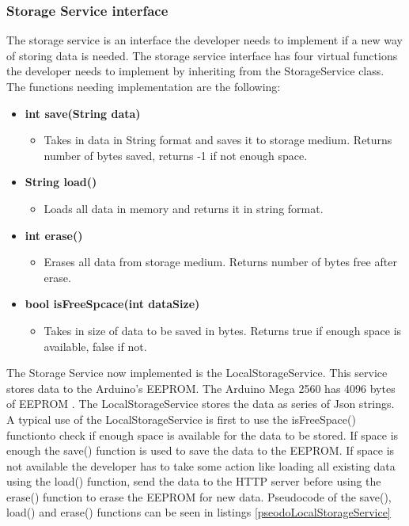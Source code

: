 \subsubsection{Storage Service interface}
The storage service is an interface the developer needs to implement if a new way of
storing data is needed. The storage service interface has four virtual functions the developer needs to implement by inheriting from the StorageService class. The functions needing implementation are the following:
\begin{itemize}
    \item \textbf{int save(String data)}
        \begin{itemize}
            \item Takes in data in String format and saves it to storage medium. 
                  Returns number of bytes saved, returns -1 if not enough space.
        \end{itemize}
    \item \textbf{String load()}
        \begin{itemize}
            \item Loads all data in memory and returns it in string format.
        \end{itemize}
    \item \textbf{int erase()}
        \begin{itemize}
            \item Erases all data from storage medium. Returns number of bytes
                  free after erase.
        \end{itemize}
    \item \textbf{bool isFreeSpcace(int dataSize)}
        \begin{itemize}
            \item Takes in size of data to be saved in bytes. Returns true if enough 
                  space is available, false if not.
        \end{itemize}
\end{itemize}
The Storage Service now implemented is the LocalStorageService. This service stores data 
to the Arduino's EEPROM. The Arduino Mega 2560 has 4096 bytes of 
EEPROM \cite{arduinoMega}. The LocalStorageService stores the data as series of Json 
strings. A typical use of the LocalStorageService is first to use the isFreeSpace() functionto check if enough space is available for the data to be stored. If space is enough the save() function is used to save the data to the EEPROM. If space is not available the developer has to take some action like loading all existing data using the load() function, send the data to the HTTP server before using the erase() function to erase the EEPROM for new data. Pseudocode of the save(), load() and erase() functions can be seen in listings \ref{pseodoLocalStorageService}

